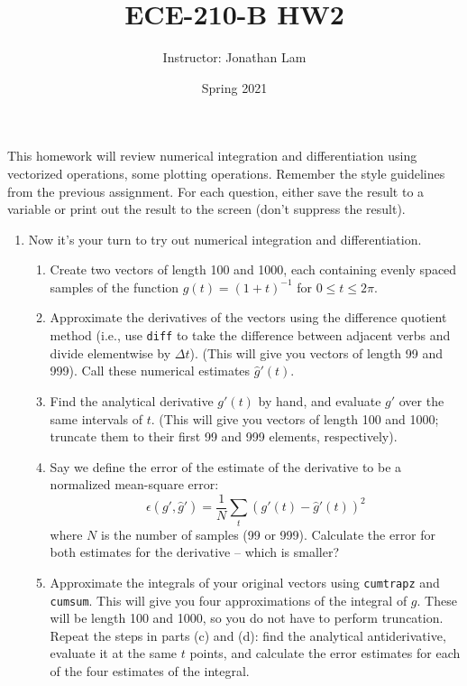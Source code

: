 \documentclass{article}
\title{ECE-210-B HW2}
\author{Instructor: Jonathan Lam}
\date{Spring 2021}
\begin{document}
	\maketitle
	
	\noindent This homework will review numerical integration and differentiation using vectorized operations, some plotting operations. Remember the style guidelines from the previous assignment. For each question, either save the result to a variable or print out the result to the screen (don't suppress the result).
	
	\begin{enumerate}
		\item
		Now it's your turn to try out numerical integration and differentiation.
		\begin{enumerate}
			\item Create two vectors of length 100 and 1000, each containing evenly spaced samples of the function $g(t)=(1+t)^{-1}$ for $0\le t\le 2\pi$.
			
			\item Approximate the derivatives of the vectors using the difference quotient method (i.e., use \lstinline|diff| to take the difference between adjacent verbs and divide elementwise by $\Delta t$). (This will give you vectors of length 99 and 999). Call these numerical estimates $\hat{g}'(t)$.
			
			\item Find the analytical derivative $g'(t)$ by hand, and evaluate $g'$ over the same intervals of $t$. (This will give you vectors of length 100 and 1000; truncate them to their first 99 and 999 elements, respectively).
			
			\item Say we define the error of the estimate of the derivative to be a normalized mean-square error:
			\begin{equation*}
				\epsilon(g',\hat{g}')=\frac{1}{N}\sum_{t} (g'(t)-\hat{g}'(t))^2
			\end{equation*}
			where $N$ is the number of samples (99 or 999). Calculate the error for both estimates for the derivative -- which is smaller?
			
			\item Approximate the integrals of your original vectors using \lstinline|cumtrapz| and \lstinline|cumsum|. This will give you four approximations of the integral of $g$. These will be length 100 and 1000, so you do not have to perform truncation. Repeat the steps in parts (c) and (d): find the analytical antiderivative, evaluate it at the same $t$ points, and calculate the error estimates for each of the four estimates of the integral.
			

\end{enumerate}
\end{enumerate}
\end{document}
